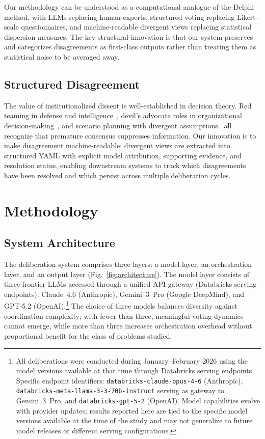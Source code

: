 \documentclass[11pt,a4paper]{article}
\begin{document}
Our methodology can be understood as a computational analogue of the Delphi method, with LLMs replacing human experts, structured voting replacing Likert-scale questionnaires, and machine-readable divergent views replacing statistical dispersion measures. The key structural innovation is that our system preserves and categorizes disagreements as first-class outputs rather than treating them as statistical noise to be averaged away.

\subsection{Structured Disagreement}

The value of institutionalized dissent is well-established in decision theory. Red teaming in defense and intelligence~\cite{zenko2015red}, devil's advocate roles in organizational decision-making~\cite{schwenk1990effects}, and scenario planning with divergent assumptions~\cite{schwartz1996art} all recognize that premature consensus suppresses information. Our innovation is to make disagreement machine-readable: divergent views are extracted into structured YAML with explicit model attribution, supporting evidence, and resolution status, enabling downstream systems to track which disagreements have been resolved and which persist across multiple deliberation cycles.

\section{Methodology}
\label{sec:methodology}

\subsection{System Architecture}
\label{sec:architecture}

The deliberation system comprises three layers: a model layer, an orchestration layer, and an output layer (Fig.~\ref{fig:architecture}). The model layer consists of three frontier LLMs accessed through a unified API gateway (Databricks serving endpoints): Claude~4.6 (Anthropic), Gemini~3~Pro (Google DeepMind), and GPT-5.2 (OpenAI).\footnote{All deliberations were conducted during January--February 2026 using the model versions available at that time through Databricks serving endpoints. Specific endpoint identifiers: \texttt{databricks-claude-opus-4-6} (Anthropic), \texttt{databricks-meta-llama-3-3-70b-instruct} serving as gateway to Gemini~3~Pro, and \texttt{databricks-gpt-5-2} (OpenAI). Model capabilities evolve with provider updates; results reported here are tied to the specific model versions available at the time of the study and may not generalize to future model releases or different serving configurations.} The choice of three models balances diversity against coordination complexity; with fewer than three, meaningful voting dynamics cannot emerge, while more than three increases orchestration overhead without proportional benefit for the class of problems studied.
\end{document}
